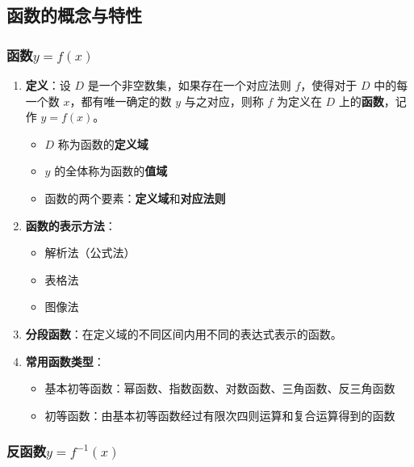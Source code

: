 \documentclass[../book.tex]{subfiles}
\begin{document}
    \subsection{函数的概念与特性}

    \subsubsection{函数$y = f(x)$}

    \begin{enumerate}
        \item \textbf{定义}：设 $D$ 是一个非空数集，如果存在一个对应法则 $f$，使得对于 $D$ 中的每一个数 $x$，都有唯一确定的数 $y$ 与之对应，则称 $f$ 为定义在 $D$ 上的\textbf{函数}，记作 $y = f(x)$。
        \begin{itemize}
            \item $D$ 称为函数的\textbf{定义域}
            \item $y$ 的全体称为函数的\textbf{值域}
            \item 函数的两个要素：\textbf{定义域}和\textbf{对应法则}
        \end{itemize}

        \item \textbf{函数的表示方法}：
        \begin{itemize}
            \item 解析法（公式法）
            \item 表格法
            \item 图像法
        \end{itemize}

        \item \textbf{分段函数}：在定义域的不同区间内用不同的表达式表示的函数。

        \item \textbf{常用函数类型}：
        \begin{itemize}
            \item 基本初等函数：幂函数、指数函数、对数函数、三角函数、反三角函数
            \item 初等函数：由基本初等函数经过有限次四则运算和复合运算得到的函数
        \end{itemize}
    \end{enumerate}

    \subsubsection{反函数$y = f^{-1}(x)$}
\end{document}
